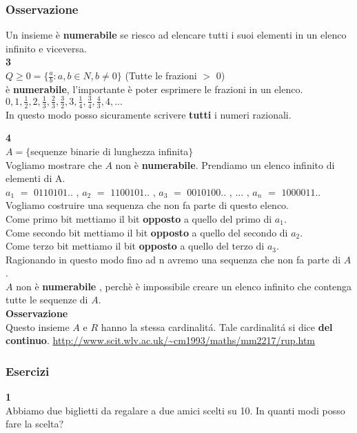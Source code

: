 \documentclass[11pt]{article}
\begin{document}
            \subsubsection{Osservazione}
            Un insieme \`e \textbf{numerabile} se riesco ad elencare tutti i suoi elementi in un elenco infinito e viceversa.\\
            \textbf{3}\\
            $Q \geq 0 =\{\frac{a}{b}:a,b \in N , b\ne 0\}$ (Tutte le frazioni $>$ 0)\\
            \`e \textbf{numerabile}, l'importante \`e poter esprimere le frazioni in un elenco.\\
            $0,1,\frac{1}{2},2,\frac{1}{3},\frac{2}{3},\frac{3}{2},3,\frac{1}{4},\frac{3}{4},\frac{4}{3},4, ...$\\ In questo modo posso sicuramente scrivere \textbf{tutti} i numeri razionali.

            \textbf{\large 4}\\
            $A=\{$sequenze binarie di lunghezza infinita$\}$\\
            Vogliamo mostrare che $A$ non \`e \textbf{numerabile}. Prendiamo un elenco infinito di elementi di A.\\
            $a_{1}$ $=$ $0110101..$ , $a_{2}$ $=$ $1100101..$ , $a_{3}$ $=$ $0010100..$ , $...$ , $a_{n}$ $=$ $1000011..$\\
            Vogliamo costruire una sequenza che non fa parte di questo elenco. \\
            Come primo bit mettiamo il bit \textbf{opposto} a quello del primo di $a_{1}$.\\
            Come secondo bit mettiamo il bit \textbf{opposto} a quello del secondo di $a_{2}$.\\
            Come terzo bit mettiamo il bit \textbf{opposto} a quello del terzo di $a_{3}$.\\
            Ragionando in questo modo fino ad n avremo una sequenza che non fa parte di $A$.
            \\$A$ non \`e \textbf{numerabile} , perch\`e \`e impossibile creare un elenco infinito che contenga tutte le sequenze di $A$.\\
            \textbf{Osservazione}\\ 
            Questo insieme $A$ e $R$ hanno la stessa cardinalit\'a. Tale cardinalit\'a si dice \textbf{del continuo}. \url{http://www.scit.wlv.ac.uk/~cm1993/maths/mm2217/rup.htm}
        \subsubsection{Esercizi}
            \textbf{\large 1}\\
            Abbiamo due biglietti da regalare a due amici scelti su 10. In quanti modi posso fare la scelta?
\end{document}
